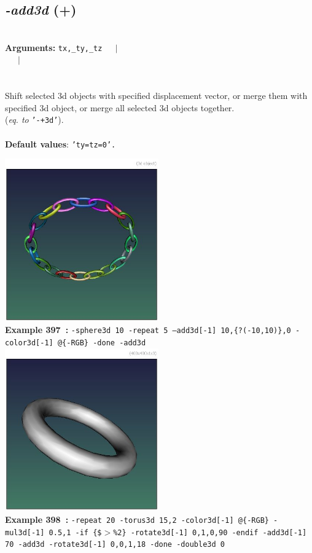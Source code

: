 \documentclass[a4paper,11pt,twoside]{book}
\begin{document}
\subsection{\emph{-add3d} (+)}\vspace*{-0.5em}
~\\\textbf{Arguments: } 
{\small \texttt{tx,\_ty,\_tz}}~~~$|$\\
\hspace*{2.2cm}{\small \texttt{[object3d]}}~~~$|$\\
\\~\\
Shift selected 3d objects with specified displacement vector, or merge them with specified
3d object, or merge all selected 3d objects together.
~\\(\emph{eq. to} {\small \texttt{'-+3d'}}).
~\\~\\\textbf{Default values}: {\small \texttt{'ty=tz=0'.}}
\begin{center}\includegraphics[keepaspectratio=true,height=7cm,width=\textwidth]{img/gmic_def397.jpg}\\
{\footnotesize \textbf{Example 397~:} \texttt{-sphere3d 10 -repeat 5 --add3d[-1] 10,\{?(-10,10)\},0 -color3d[-1] @\{-RGB\} -done -add3d}}
\\\includegraphics[keepaspectratio=true,height=7cm,width=\textwidth]{img/gmic_def398.jpg}\\
{\footnotesize \textbf{Example 398~:} \texttt{-repeat 20 -torus3d 15,2 -color3d[-1] @\{-RGB\} -mul3d[-1] 0.5,1 -if \{\$$>$\%2\} -rotate3d[-1] 0,1,0,90 -endif -add3d[-1] 70 -add3d -rotate3d[-1] 0,0,1,18 -done -double3d 0}}
\end{center}
\end{document}
